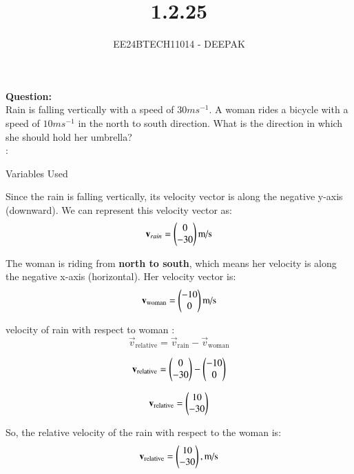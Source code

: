 \documentclass[journal]{IEEEtran}
\begin{document}

\vspace{3cm}

\title{1.2.25}
\author{EE24BTECH11014 - DEEPAK
}
{\let\newpage\relax\maketitle}

\renewcommand{\thefigure}{\theenumi}
\renewcommand{\thetable}{\theenumi}
\setlength{\intextsep}{10pt} %


\renewcommand{\thetable}{\theenumi}




\textbf{Question: }\\

Rain is falling vertically with a speed of $ 30 ms^{-1}$. A woman rides a bicycle with a speed of $10 ms^{-1}$ in the north to south direction. What is the direction in which she should hold her umbrella?
\\
\solution :
\begin{table}[h!]    
  \centering
  
  \caption{Variables Used}
  \label{tab1.1.9.2}
\end{table}


Since the rain is falling vertically, its velocity vector is along the negative y-axis (downward). We can represent this velocity vector as:
\[
\mathbf{v}_{rain} = \begin{pmatrix}0\\-30\end{pmatrix} \text{m/s}
\]


The woman is riding from \textbf{north to south}, which means her velocity is along the negative x-axis (horizontal). Her velocity vector is:
\[
\mathbf{v}_{\text{woman}} = \begin{pmatrix}-10\\0\end{pmatrix} \text{m/s}
\]

velocity of rain with respect to woman :
\[
\vec{v}_{\text{relative}} = \vec{v}_{\text{rain}} - \vec{v}_{\text{woman}}
\]

\[
\mathbf{v}_{\text{relative}} = \begin{pmatrix}0\\-30\end{pmatrix} - \begin{pmatrix}-10\\0\end{pmatrix}
\]

\[
\mathbf{v}_{\text{relative}} = \begin{pmatrix}10\\-30\end{pmatrix}
\]

So, the relative velocity of the rain with respect to the woman is:
\[
\mathbf{v}_{\text{relative}} = \begin{pmatrix}10\\-30\end{pmatrix}, \text{m/s}
\]
\end{document}
